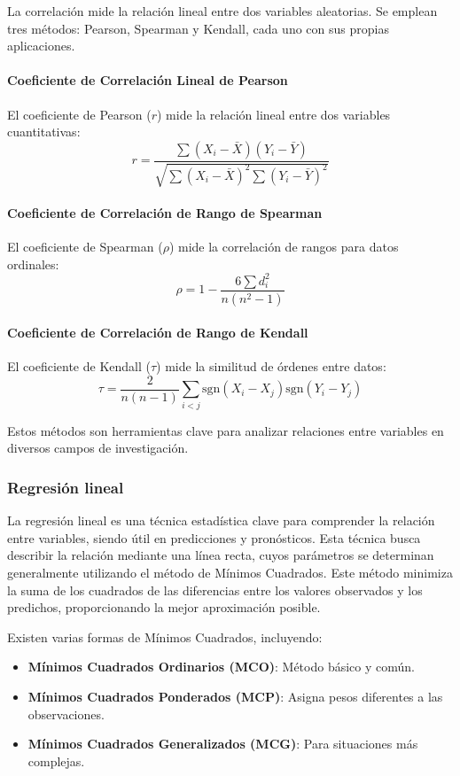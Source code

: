 La correlación mide la relación lineal entre dos variables aleatorias. Se emplean tres métodos: Pearson, Spearman y Kendall, cada uno con sus propias aplicaciones.

\paragraph{Coeficiente de Correlación Lineal de Pearson}

El coeficiente de Pearson (\( r \)) mide la relación lineal entre dos variables cuantitativas:
\[
r = \frac{\sum (X_i - \bar{X})(Y_i - \bar{Y})}{\sqrt{\sum (X_i - \bar{X})^2 \sum (Y_i - \bar{Y})^2}}
\]

\paragraph{Coeficiente de Correlación de Rango de Spearman}

El coeficiente de Spearman (\( \rho \)) mide la correlación de rangos para datos ordinales:
\[
\rho = 1 - \frac{6 \sum d_i^2}{n(n^2 - 1)}
\]

\paragraph{Coeficiente de Correlación de Rango de Kendall}

El coeficiente de Kendall (\( \tau \)) mide la similitud de órdenes entre datos:
\[
\tau = \frac{2}{n(n-1)} \sum_{i<j} \text{sgn}(X_i - X_j) \text{sgn}(Y_i - Y_j)
\]

Estos métodos son herramientas clave para analizar relaciones entre variables en diversos campos de investigación.




\subsubsection{Regresión lineal}
La regresión lineal es una técnica estadística clave para comprender la relación entre variables, siendo útil en predicciones y pronósticos. Esta técnica busca describir la relación mediante una línea recta, cuyos parámetros se determinan generalmente utilizando el método de Mínimos Cuadrados. Este método minimiza la suma de los cuadrados de las diferencias entre los valores observados y los predichos, proporcionando la mejor aproximación posible. 

Existen varias formas de Mínimos Cuadrados, incluyendo:

\begin{itemize}[leftmargin=*]
  \item \textbf{Mínimos Cuadrados Ordinarios (MCO)}: Método básico y común.
  \item \textbf{Mínimos Cuadrados Ponderados (MCP)}: Asigna pesos diferentes a las observaciones.
  \item \textbf{Mínimos Cuadrados Generalizados (MCG)}: Para situaciones más complejas.
\end{itemize}


